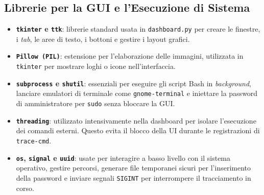 \subsection{Librerie per la GUI e l'Esecuzione di Sistema}
\begin{itemize}
    \item \textbf{\texttt{tkinter} e \texttt{ttk}}: librerie standard usata in \texttt{dashboard.py} per creare le finestre, i \textit{tab}, le aree di testo, i bottoni e gestire i layout grafici.
    \item \textbf{\texttt{Pillow (PIL)}}: estensione per l'elaborazione delle immagini, utilizzata in \texttt{tkinter} per mostrare loghi o icone nell'interfaccia.
    \item \textbf{\texttt{subprocess} e \texttt{shutil}}: essenziali per eseguire gli script Bash in \textit{background}, lanciare emulatori di terminale come \texttt{gnome-terminal} e iniettare la password di amministratore per \texttt{sudo} senza bloccare la GUI.
    \item \textbf{\texttt{threading}}: utilizzato intensivamente nella dashboard per isolare l'esecuzione dei comandi esterni. Questo evita il blocco della UI durante le registrazioni di \texttt{trace-cmd}.
    \item \textbf{\texttt{os}, \texttt{signal} e \texttt{uuid}}: usate per interagire a basso livello con il sistema operativo, gestire percorsi, generare file temporanei sicuri per l'inserimento della password e inviare segnali \texttt{SIGINT} per interrompere il tracciamento in corso.
\end{itemize}
